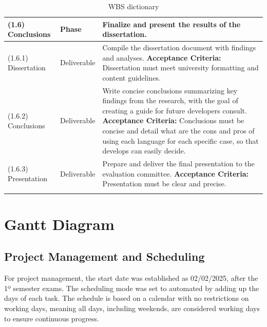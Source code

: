 \begin{longtable}{|p{3cm}|p{2.5cm}|p{8cm}|}
      (1.6) Conclusions              & Phase                 & Finalize and present the results of the dissertation.                                                                                                                                                                                                                                                                                                     \\ \hline
      (1.6.1) Dissertation           & Deliverable           & Compile the dissertation document with findings and analyses. \newline \textbf{Acceptance Criteria:} Dissertation must meet university formatting and content guidelines.                                                                                                                                                                                 \\ \hline
      (1.6.2) Conclusions            & Deliverable           & Write concise conclusions summarizing key findings from the research, with the goal of creating a guide for future developers consult. \newline \textbf{Acceptance Criteria:} Conclusions must be concise and detail what are the cons and pros of using each language for each specific case, so that develops can easily decide.                        \\ \hline
      (1.6.3) Presentation           & Deliverable           & Prepare and deliver the final presentation to the evaluation committee. \newline \textbf{Acceptance Criteria:} Presentation must be clear and precise.                                                                                                                                                                                                    \\ \hline
      \caption{WBS dictionary}
\end{longtable}

\section{Gantt Diagram}

\subsection{Project Management and Scheduling}

For project management, the start date was established as 02/02/2025, after the 1º semester exams. The scheduling mode was set to automated by adding up the days of each task. The schedule is based on a calendar with no restrictions on working days, meaning all days, including weekends, are considered working days to ensure continuous progress.

